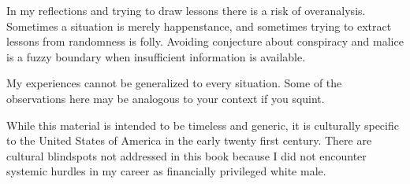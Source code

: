 In my reflections and trying to draw lessons there is a risk of overanalysis. Sometimes a situation is merely happenstance, and sometimes trying to extract lessons from randomness is folly. Avoiding conjecture about conspiracy and malice is a fuzzy boundary when insufficient information is available. 

My experiences cannot be generalized to every situation. Some of the observations here may be analogous to your context if you squint. 


While this material is intended to be timeless and generic, it is culturally specific to the United States of America in the early twenty first century. 
There are cultural blindspots not addressed in this book because I did not encounter systemic hurdles in my career as financially privileged white male. 
